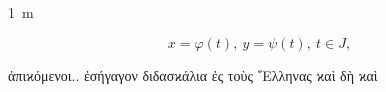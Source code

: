 \documentclass{scrbook}
\newcommand{\GREEK}[1]{\foreignlanguage{greek}{#1}}
\begin{document}
 \SI{1}{\m}
 \blindtext[3]
 
 \begin{equation}\label{mai:eq027}
  x=\varphi(t),\ y=\psi(t),\ t\in J,
\end{equation}

\GREEK{ἀπιϰόμενοι.. ἐσήγαγον διδασϰάλια ἐς τοὺς ῞Ελληνας ϰαὶ δὴ ϰαὶ }
\end{document}
